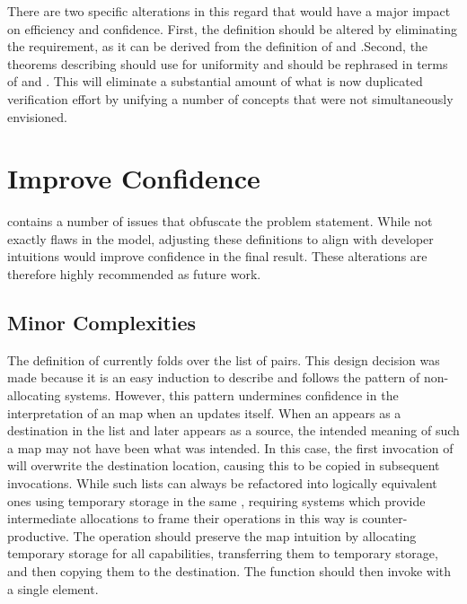 There are two specific alterations in this regard that would have a major impact on efficiency and confidence.
First, the \COQagPotTransferFnReq{} definition should be altered by eliminating the \COQagNondecr{} requirement, as it can be derived from the definition of \COQagAddCommute{} and \COQagEquiv{}.\pagebreak[0]
Second, the theorems describing \COQendow{} should use \COQAGproject{} for uniformity and \COQmutable{} should be rephrased in terms of \COQagFlow{} and \COQagExFlow{}.
This will eliminate a substantial amount of what is now duplicated verification effort by unifying a number of concepts that were not simultaneously envisioned.

\section{Improve Confidence}

\xmakefirstuc{\TMmodelName} contains a number of issues that obfuscate the problem statement.
While not exactly flaws in the model, adjusting these definitions to align with developer intuitions would improve confidence in the final result.
These alterations are therefore highly recommended as future work.

\subsection{Minor Complexities}

\label{sect:future:complexities}

The definition of \COQcopyCapList{} currently folds \COQcopyCap{} over the list of \TMidx{} pairs.
This design decision was made because it is an easy induction to describe and follows the pattern of non-allocating systems.
However, this pattern undermines confidence in the interpretation of an \TMidx{} map when an \TMobj{} updates itself.
When an \TMidx{} appears as a destination in the list and later appears as a source, the intended meaning of such a map may not have been what was intended.
In this case, the first invocation of \COQcopyCap{} will overwrite the destination location, causing this \TMcap{} to be copied in subsequent invocations.
While such lists can always be refactored into logically equivalent ones using temporary storage in the same \TMobj{}, requiring systems which provide intermediate allocations to frame their operations in this way is counter-productive.
The \COQcopyCapList{} operation should preserve the map intuition by allocating temporary storage for all capabilities, transferring them to temporary storage, and then copying them to the destination.
The \COQcopyCap{} function should then invoke \COQcopyCapList with a single element.

